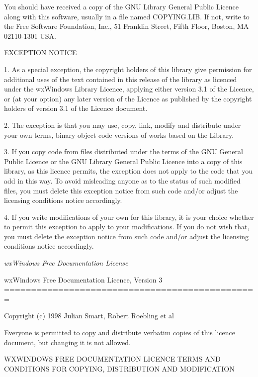 You should have received a copy of the GNU Library General Public Licence
along with this software, usually in a file named COPYING.LIB.  If not,
write to the Free Software Foundation, Inc., 51 Franklin Street, Fifth
Floor, Boston, MA 02110-1301 USA.

EXCEPTION NOTICE

1. As a special exception, the copyright holders of this library give
permission for additional uses of the text contained in this release of the
library as licenced under the wxWindows Library Licence, applying either
version 3.1 of the Licence, or (at your option) any later version of the
Licence as published by the copyright holders of version 3.1 of the Licence
document.

2. The exception is that you may use, copy, link, modify and distribute
under your own terms, binary object code versions of works based on the
Library.

3. If you copy code from files distributed under the terms of the GNU
General Public Licence or the GNU Library General Public Licence into a
copy of this library, as this licence permits, the exception does not apply
to the code that you add in this way.  To avoid misleading anyone as to the
status of such modified files, you must delete this exception notice from
such code and/or adjust the licensing conditions notice accordingly.

4. If you write modifications of your own for this library, it is your
choice whether to permit this exception to apply to your modifications.  If
you do not wish that, you must delete the exception notice from such code
and/or adjust the licensing conditions notice accordingly.

\textit{wxWindows Free Documentation License}

\begin{center}
	wxWindows Free Documentation Licence, Version 3
	===============================================
\end{center}

Copyright (c) 1998 Julian Smart, Robert Roebling et al

Everyone is permitted to copy and distribute verbatim copies
of this licence document, but changing it is not allowed.

\begin{center}
	WXWINDOWS FREE DOCUMENTATION LICENCE
	TERMS AND CONDITIONS FOR COPYING, DISTRIBUTION AND MODIFICATION
\end{center}

